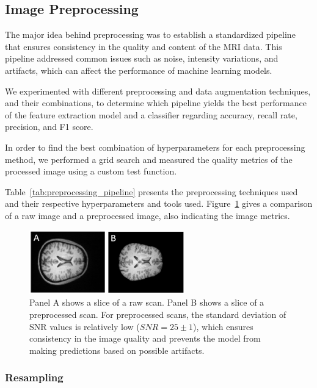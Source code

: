 %
\subsection{Image Preprocessing}

The major idea behind preprocessing was to establish a standardized pipeline that ensures consistency in the quality and content of the MRI data. This pipeline addressed common issues such as noise, intensity variations, and artifacts, which can affect the performance of machine learning models.

We experimented with different preprocessing and data augmentation techniques, and their combinations, to determine which pipeline yields the best performance of the feature extraction model and a classifier regarding accuracy, recall rate, precision, and F1 score.

In order to find the best combination of hyperparameters for each preprocessing method, we performed a grid search and measured the quality metrics of the processed image using a custom test function.

Table~\ref{tab:preprocessing_pipeline} presents the preprocessing techniques used and their respective hyperparameters and tools used. Figure~\ref{fig:slice_comparison} gives a comparison of a raw image and a preprocessed image, also indicating the image metrics.
%
\begin{figure}[h]
    \centering
    \includegraphics[width=0.6\textwidth]{./figs/slice_comparison.png} %
    \caption{Panel A shows a slice of a raw scan. Panel B shows a slice of a preprocessed scan. For preprocessed scans, the standard deviation of SNR values is relatively low (\mbox{$SNR= 25 \pm 1$}), which ensures consistency in the image quality and prevents the model from making predictions based on possible artifacts.}\label{fig:slice_comparison}
\end{figure}

\subsubsection{Resampling}


